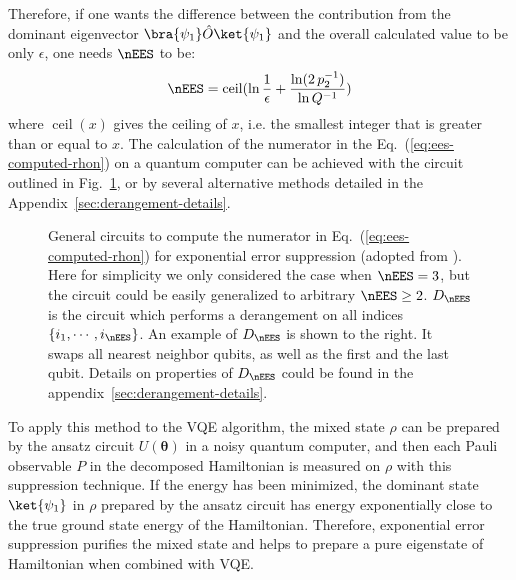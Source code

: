 Therefore, if one wants the difference between the contribution from the dominant eigenvector $\bra{\psi_1} \hat{O} \ket{\psi_1}$ 
and the overall calculated value to be only $\epsilon$, one needs $\nEES$ to be\cite{koczorExponentialErrorSuppression2021}:
\begin{equation}
    \nEES = \operatorname{ceil}(\ln{\frac{1}{\epsilon}} + \frac{\ln(2\,p^{-1}_2)}{\ln Q^{-1}})
\end{equation}
where $\operatorname{ceil}(x)$ gives the ceiling of $x$, i.e. the smallest integer that is greater than or equal to $x$.
The calculation of the numerator in the Eq.~(\ref{eq:ees-computed-rhon}) on a quantum computer can be achieved
with the circuit outlined in Fig.~\ref{fig:ees-controlled-D-implement}, or by several alternative methods detailed in the Appendix~\ref{sec:derangement-details}.

\begin{figure}
    \subfloat[Example of exponential error suppression circuit for $\nEES=3$]{
        \label{fig:ees-general-circ}
        \makebox[0.5\linewidth]{
        
        }
    }
    \caption{General circuits to compute the numerator in Eq.~(\ref{eq:ees-computed-rhon})
    for exponential error suppression 
    (adopted from \citet{koczorExponentialErrorSuppression2021}).
    Here for simplicity we only considered the case when $\nEES=3$,
    but the circuit could be easily generalized to arbitrary $\nEES\geq 2$.
    $D_\nEES$ is the circuit which performs a derangement on all indices $\{i_1,\cdots,i_\nEES\}$. An example of $D_\nEES$
    is shown to the right. It swaps all nearest neighbor qubits, as well as the first and the last qubit. Details on properties of $D_\nEES$ could be found in the appendix~\ref{sec:derangement-details}.
    }
    \label{fig:ees-controlled-D-implement}
\end{figure}


To apply this method to the VQE algorithm, the mixed state $\rho$ can be prepared by the ansatz circuit $U(\boldsymbol{\theta})$
in a noisy quantum computer, and then each Pauli observable $P$ in the decomposed Hamiltonian is measured
on $\rho$ with this suppression technique. 
If the energy has been minimized, the dominant state $\ket{\psi_1}$ in $\rho$ prepared by the ansatz circuit
has energy exponentially close to the true ground state energy of the Hamiltonian.
Therefore, exponential error suppression purifies the mixed state and helps to prepare a pure eigenstate of Hamiltonian when combined with VQE.

